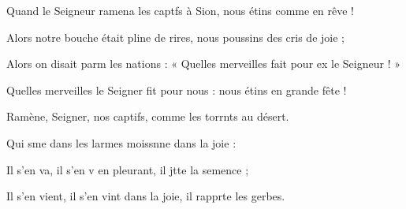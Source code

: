 \item Quand le Seigneur ramena les captfs à Sion,\psstar{} nous étins comme en rêve !
\item Alors notre bouche était pline de rires,\psstar{} nous poussins des cris de joie ;
\item Alors on disait parm les nations :\psstar{} « Quelles merveilles fait pour ex le Seigneur ! »
\item Quelles merveilles le Seigner fit pour nous :\psstar{} nous étins en grande fête !
\item Ramène, Seigner, nos captifs,\psstar{} comme les torrnts au désert.
\item Qui sme dans les larmes\psstar{} moissnne dans la joie :
\item Il s’en va, il s’en v en pleurant,\psstar{} il jtte la semence ;
\item Il s’en vient, il s’en vint dans la joie,\psstar{} il rapprte les gerbes.